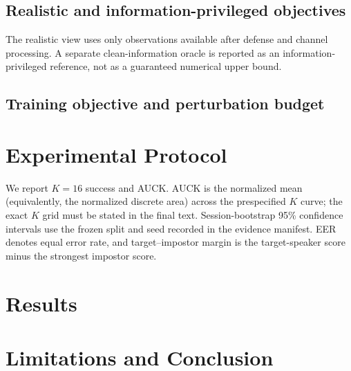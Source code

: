 \documentclass{article}
\begin{document}
\subsection{Realistic and information-privileged objectives}
The realistic view uses only observations available after defense and channel
processing. A separate clean-information oracle is reported as an
information-privileged reference, not as a guaranteed numerical upper bound.

\subsection{Training objective and perturbation budget}

\section{Experimental Protocol}
\label{sec:experiments}

We report $K{=}16$ success and AUCK. AUCK is the normalized mean (equivalently,
the normalized discrete area) across the prespecified $K$ curve; the exact
$K$ grid must be stated in the final text. Session-bootstrap 95\% confidence
intervals use the frozen split and seed recorded in the evidence manifest.
EER denotes equal error rate, and target--impostor margin is the target-speaker
score minus the strongest impostor score.

\section{Results}
\label{sec:results}






\section{Limitations and Conclusion}
\label{sec:conclusion}

\clearpage


\end{document}
